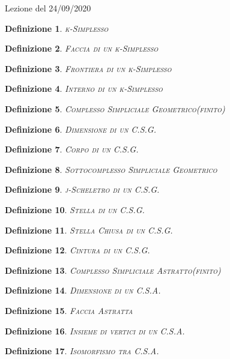 \documentclass{article}
\newtheorem{defn}{Definizione}[section]
\begin{document}
  \begin{section}{Lezione del 24/09/2020}
    \begin{defn}{\scshape k-Simplesso\\}
    \end{defn}
    \begin{defn}{\scshape Faccia di un k-Simplesso\\}
    \end{defn}
    \begin{defn}{\scshape Frontiera di un k-Simplesso\\}
    \end{defn}
    \begin{defn}{\scshape Interno di un k-Simplesso\\}
    \end{defn}
    \begin{defn}{\scshape Complesso Simpliciale Geometrico(finito)\\}
    \end{defn}
    \begin{defn}{\scshape Dimensione di un C.S.G.\\}
    \end{defn}
    \begin{defn}{\scshape Corpo di un C.S.G.\\}
    \end{defn}
    \begin{defn}{\scshape Sottocomplesso Simpliciale Geometrico\\}
    \end{defn}
    \begin{defn}{\scshape j-Scheletro di un C.S.G.\\}
    \end{defn}
    \begin{defn}{\scshape Stella di un C.S.G.\\}
    \end{defn}
    \begin{defn}{\scshape Stella Chiusa di un C.S.G.\\}
    \end{defn}
    \begin{defn}{\scshape Cintura di un C.S.G.\\}
    \end{defn}
    \begin{defn}{\scshape Complesso Simpliciale Astratto(finito)\\}
    \end{defn}
    \begin{defn}{\scshape Dimensione di un C.S.A.\\}
    \end{defn}
    \begin{defn}{\scshape Faccia Astratta\\}
    \end{defn}
    \begin{defn}{\scshape Insieme di vertici di un C.S.A.\\}
    \end{defn}
    \begin{defn}{\scshape Isomorfismo tra C.S.A.\\}
    \end{defn}
  \end{section}
\end{document}
